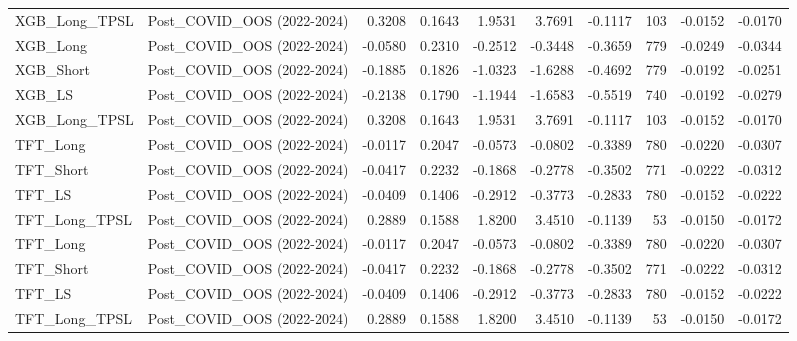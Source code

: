 \begin{tabular}{llrrrrrrrr}
\cline{1-10}
XGB\_Long\_TPSL & Post\_COVID\_OOS (2022-2024) & 0.3208 & 0.1643 & 1.9531 & 3.7691 & -0.1117 & 103 & -0.0152 & -0.0170 \\
\cline{1-10}
XGB\_Long & Post\_COVID\_OOS (2022-2024) & -0.0580 & 0.2310 & -0.2512 & -0.3448 & -0.3659 & 779 & -0.0249 & -0.0344 \\
\cline{1-10}
XGB\_Short & Post\_COVID\_OOS (2022-2024) & -0.1885 & 0.1826 & -1.0323 & -1.6288 & -0.4692 & 779 & -0.0192 & -0.0251 \\
\cline{1-10}
XGB\_LS & Post\_COVID\_OOS (2022-2024) & -0.2138 & 0.1790 & -1.1944 & -1.6583 & -0.5519 & 740 & -0.0192 & -0.0279 \\
\cline{1-10}
XGB\_Long\_TPSL & Post\_COVID\_OOS (2022-2024) & 0.3208 & 0.1643 & 1.9531 & 3.7691 & -0.1117 & 103 & -0.0152 & -0.0170 \\
\cline{1-10}
TFT\_Long & Post\_COVID\_OOS (2022-2024) & -0.0117 & 0.2047 & -0.0573 & -0.0802 & -0.3389 & 780 & -0.0220 & -0.0307 \\
\cline{1-10}
TFT\_Short & Post\_COVID\_OOS (2022-2024) & -0.0417 & 0.2232 & -0.1868 & -0.2778 & -0.3502 & 771 & -0.0222 & -0.0312 \\
\cline{1-10}
TFT\_LS & Post\_COVID\_OOS (2022-2024) & -0.0409 & 0.1406 & -0.2912 & -0.3773 & -0.2833 & 780 & -0.0152 & -0.0222 \\
\cline{1-10}
TFT\_Long\_TPSL & Post\_COVID\_OOS (2022-2024) & 0.2889 & 0.1588 & 1.8200 & 3.4510 & -0.1139 & 53 & -0.0150 & -0.0172 \\
\cline{1-10}
TFT\_Long & Post\_COVID\_OOS (2022-2024) & -0.0117 & 0.2047 & -0.0573 & -0.0802 & -0.3389 & 780 & -0.0220 & -0.0307 \\
\cline{1-10}
TFT\_Short & Post\_COVID\_OOS (2022-2024) & -0.0417 & 0.2232 & -0.1868 & -0.2778 & -0.3502 & 771 & -0.0222 & -0.0312 \\
\cline{1-10}
TFT\_LS & Post\_COVID\_OOS (2022-2024) & -0.0409 & 0.1406 & -0.2912 & -0.3773 & -0.2833 & 780 & -0.0152 & -0.0222 \\
\cline{1-10}
TFT\_Long\_TPSL & Post\_COVID\_OOS (2022-2024) & 0.2889 & 0.1588 & 1.8200 & 3.4510 & -0.1139 & 53 & -0.0150 & -0.0172 \\
\cline{1-10}
\bottomrule
\end{tabular}
